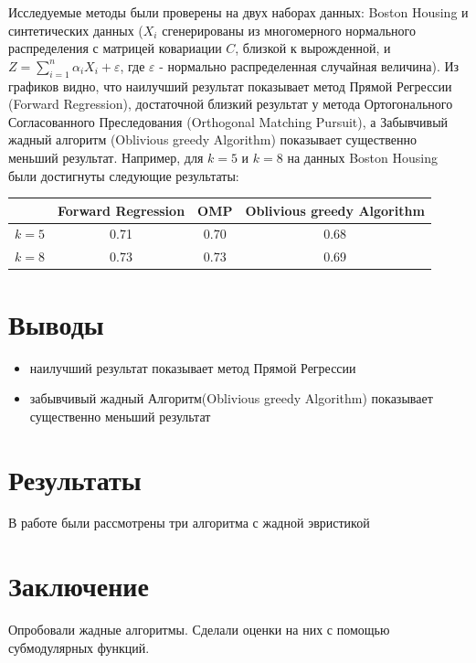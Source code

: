 \documentclass[preprint,12pt]{elsarticle}
\begin{document}
Исследуемые методы были проверены на двух наборах данных: Boston Housing и синтетических данных ($X_i$ сгенерированы из многомерного нормального распределения с матрицей ковариации $C$, близкой к вырожденной, и $Z = \sum\limits_{i = 1}^n \alpha_i X_i + \varepsilon$, где $\varepsilon$ - нормально распределенная случайная величина). Из графиков видно, что наилучший результат показывает метод Прямой Регрессии (Forward Regression), достаточной близкий результат у метода Ортогонального Согласованного Преследования (Orthogonal Matching Pursuit), а Забывчивый жадный алгоритм (Oblivious greedy Algorithm) показывает существенно меньший результат. Например, для $k = 5$ и $k = 8$ на данных Boston Housing были достигнуты следующие результаты: 
\begin{center}
    \begin{tabular}{ |c|c|c|c| } 
        \hline
          & Forward Regression & OMP & Oblivious greedy Algorithm \\ 
         \hline
         $k = 5$ & 0.71 & 0.70 & 0.68 \\ 
         \hline
         $k = 8$ & 0.73 & 0.73 & 0.69 \\ 
         \hline
    \end{tabular}
\end{center}


\section{Выводы}
\begin{itemize}
    \item наилучший результат показывает метод Прямой Регрессии
    \item забывчивый жадный Алгоритм(Oblivious greedy Algorithm) показывает существенно меньший результат
\end{itemize}

\section{Результаты}

В работе были рассмотрены три алгоритма с жадной эвристикой

\section{Заключение}
\label{S:5}
Опробовали жадные алгоритмы. Сделали оценки на них с помощью субмодулярных функций. 




\end{document}
